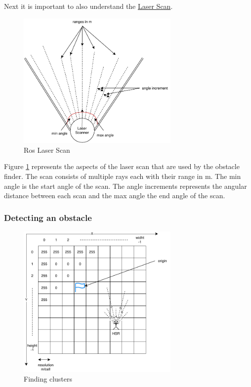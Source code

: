 \documentclass[main.tex]{subfiles}
\begin{document}
		Next it is important to also understand the \href{http://docs.ros.org/melodic/api/sensor_msgs/html/msg/LaserScan.html}{Laser Scan}. 
		\begin{figure}[H]
			\centering
			\includegraphics[width=0.7\textwidth]{pictures/obstacle_finder/laserSnan.pdf}
			\caption{Ros Laser Scan}
			\label{img_laser_scan}
		\end{figure}
		 
		Figure \ref{img_laser_scan} represents the  aspects of the laser scan that are used by the obstacle finder. The scan consists of multiple rays each with their range in m. The min angle is the start angle of the scan. The angle increments represents the angular distance between each scan and the max angle the end angle of the scan.
		
		\subsubsection{Detecting an obstacle}
		
		\begin{figure}[H]
			\centering
			\includegraphics[width=0.7\textwidth]{pictures/obstacle_finder/Cluster-building.pdf}
			\caption{Finding clusters}
			\label{img_finding_cluster}
		\end{figure}   
	
\end{document}
